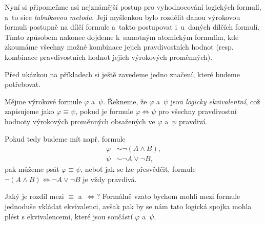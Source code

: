 Nyní si připomeňme asi nejznámější postup pro vyhodnocování logických formulí, a~to sice \emph{tabulkovou metodu}. Její myšlenkou bylo rozdělit danou výrokovou formuli postupně na dílčí formule a~takto postupovat i~u~daných dílčích formulí. Tímto způsobem nakonec dojdeme k~samotným atomickým formulím, kde zkoumáme všechny možné kombinace jejich pravdivostních hodnot (resp. kombinace pravdivostních hodnot jejich výrokových proměnných).\par
Před ukázkou na příkladech si ještě zavedeme jedno značení, které budeme potřebovat.
\begin{definition}
    Mějme výrokové formule $\varphi$ a~$\psi$. Řekneme, že $\varphi$ a~$\psi$ jsou \emph{logicky ekvivalentní}, což zapisujeme jako $\varphi\equiv\psi$, pokud je formule $\varphi \iff \psi$ pro všechny pravdivostní hodnoty výrokových proměnných obsažených ve $\varphi$ a~$\psi$ pravdivá.
\end{definition}
Pokud tedy budeme mít např. formule
\begin{align*}
    \varphi &\sim \neg (A \land B),\\
    \psi &\sim \neg A \lor \neg B,
\end{align*}
pak můžeme psát $\varphi\equiv\psi$, neboť jak se lze přesvědčit, formule $\neg (A \land B) \iff \neg A \lor \neg B$ je vždy pravdivá.\par
Jaký je rozdíl mezi $\equiv$ a~$\iff$? Formálně vzato bychom mohli mezi formule jednoduše vkládat ekvivalenci, avšak pak by se nám tato logická spojka mohla plést s ekvivalencemi, které jsou součástí $\varphi$ a~$\psi$.
